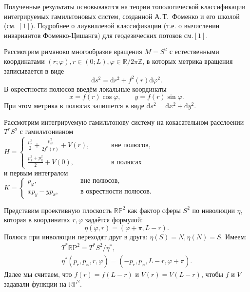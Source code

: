 \vzmscaption




Полученные результаты основываются на теории топологической классификации интегрируемых гамильтоновых систем, созданной А.\,Т.~Фоменко и его школой (см. $\left[1\right]$). Подробнее о лиувиллевой классификации (т.е. о вычислении инвариантов Фоменко-Цишанга) для геодезических потоков см.$\left[1\right]$.



Рассмотрим риманово многообразие вращения $M=S^2$ с естественными координатами $(r;\varphi), r \in (0;L), \varphi \in \mathbb{R}/2\pi\mathbb{Z}$, в которых метрика вращения записывается в виде
\[\mathrm{d}s^2=\mathrm{d}r^2+f^2(r)\mathrm{d}\varphi^2.\] В окрестности полюсов введём локальные координаты
\[x=f(r)\cos{\varphi},\qquad y=f(r)\sin{\varphi}.\] При этом метрика в полюсах запишется в виде $\mathrm{d}s^2=\mathrm{d}x^2+\mathrm{d}y^2$.


Рассмотрим интегрируемую гамильтонову систему на кокасательном расслоении $T^*S^2$ с гамильтонианом
\\
$ H = \begin{cases} \displaystyle \frac{p^2_{r}}{2}+\frac{p^2_{\varphi}}{2f^2(r)}+V(r), \qquad & \text{ вне полюсов,} \\ \displaystyle \frac{p^2_{x}+p^2_{y}}{2}+V(0), \qquad & \text{ в полюсах} \end{cases} $
\\
и первым интегралом
\\
 $K= \begin{cases} p_{\varphi}, \qquad &\text{ вне полюсов,} \\ xp_{y}-yp_{x}, \qquad & \text{ в окрестности полюсов.} \end{cases} $



Представим проективную плоскость $\mathbb{RP}^2$ как фактор сферы $S^2$ по инволюции $\eta$, которая в координатах $r,\varphi$ задаётся формулой: \[ \eta (\varphi, r) = (\varphi + \pi, L-r).\] Полюса при инволюции переходят друг в друга: $\eta (S)=N,\eta(N)=S$. Имеем: \begin{gather*}
 T^{*}\mathbb{R}\mathrm{P}^2=T^{*}S^2/\eta ^{*},\\
 \eta^{*}(p_{r},p_{\varphi},r,\varphi)=(-p_{r},p_{\varphi},L-r,\varphi+\pi).
 \end{gather*} Далее мы считаем, что $f(r)=f(L-r)$ и $V(r) = V(L-r)$, чтобы $f$ и $V$ задавали функции на $\mathbb{RP}^2$.


